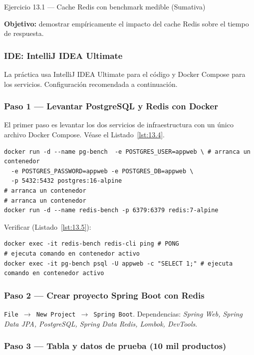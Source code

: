 \begin{cajaejercicio}{Ejercicio 13.1 --- Cache Redis con benchmark medible (Sumativa)}

\textbf{Objetivo:} demostrar empíricamente el impacto del cache Redis
sobre el tiempo de respuesta.

\subsubsection*{IDE: IntelliJ IDEA Ultimate}

La práctica usa IntelliJ IDEA Ultimate para el código y
Docker Compose para los servicios. Configuración recomendada a
continuación.


\subsubsection*{Paso 1 --- Levantar PostgreSQL y Redis con Docker}

El primer paso es levantar los dos servicios de
infraestructura con un único archivo Docker Compose. V\'ease el Listado~\ref{lst:13.4}.


\begin{lstlisting}[style=shell,numbers=none,caption={Ejemplo de Shell},label=lst:13.4]
docker run -d --name pg-bench  -e POSTGRES_USER=appweb \ # arranca un contenedor
  -e POSTGRES_PASSWORD=appweb -e POSTGRES_DB=appweb \
  -p 5432:5432 postgres:16-alpine
# arranca un contenedor
# arranca un contenedor
docker run -d --name redis-bench -p 6379:6379 redis:7-alpine
\end{lstlisting}

Verificar (Listado~\ref{lst:13.5}):
\begin{lstlisting}[style=shell,numbers=none,caption={Ejemplo de Shell},label=lst:13.5]
docker exec -it redis-bench redis-cli ping # PONG
# ejecuta comando en contenedor activo
docker exec -it pg-bench psql -U appweb -c "SELECT 1;" # ejecuta comando en contenedor activo
\end{lstlisting}

\subsubsection*{Paso 2 --- Crear proyecto Spring Boot con Redis}

\texttt{File $\rightarrow$ New Project $\rightarrow$ Spring Boot}.
Dependencias: \emph{Spring Web, Spring Data JPA, PostgreSQL, Spring
Data Redis, Lombok, DevTools}.

\subsubsection*{Paso 3 --- Tabla y datos de prueba (10 mil productos)}


\end{cajaejercicio}
